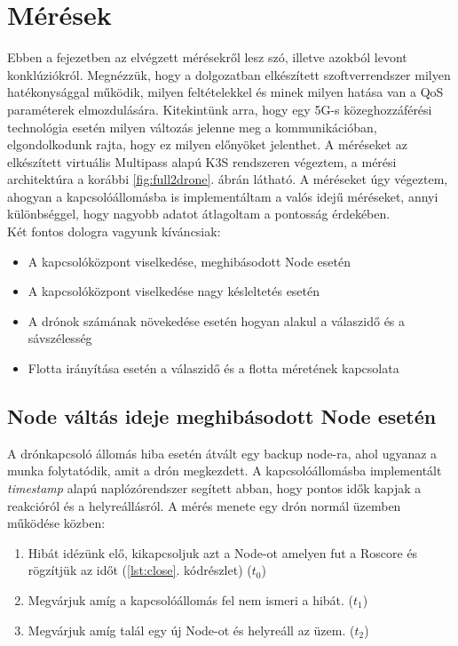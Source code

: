 \chapter{Mérések}

Ebben a fejezetben az elvégzett mérésekről lesz szó, illetve azokból levont konklúziókról. Megnézzük, hogy a dolgozatban elkészített szoftverrendszer milyen hatékonysággal működik, milyen feltételekkel és minek milyen hatása van a QoS paraméterek elmozdulására. Kitekintünk arra, hogy egy 5G-s közeghozzáférési technológia esetén milyen változás jelenne meg a kommunikációban, elgondolkodunk rajta, hogy ez milyen előnyöket jelenthet. A méréseket az elkészített virtuális Multipass alapú K3S rendszeren végeztem, a mérési architektúra a korábbi \ref{fig:full2drone}. ábrán látható. A méréseket úgy végeztem, ahogyan a kapcsolóállomásba is implementáltam a valós idejű méréseket, annyi különbséggel, hogy nagyobb adatot átlagoltam a pontosság érdekében. \\

\noindent
Két fontos dologra vagyunk kíváncsiak:
\begin{itemize}
	\item A kapcsolóközpont viselkedése, meghibásodott Node esetén
	\item A kapcsolóközpont viselkedése nagy késleltetés esetén
	\item A drónok számának növekedése esetén hogyan alakul a válaszidő és a sávszélesség
	\item Flotta irányítása esetén a válaszidő és a flotta méretének kapcsolata
\end{itemize}

\section{Node váltás ideje meghibásodott Node esetén}
A drónkapcsoló állomás hiba esetén átvált egy backup node-ra, ahol ugyanaz a munka folytatódik, amit a drón megkezdett. A kapcsolóállomásba implementált \emph{timestamp} alapú naplózórendszer segített abban, hogy pontos idők kapjak a reakcióról és a helyreállásról. A mérés menete egy drón normál üzemben működése közben:
\begin{enumerate}
	\item Hibát idézünk elő, kikapcsoljuk azt a Node-ot amelyen fut a Roscore és rögzítjük az időt (\ref{lst:close}. kódrészlet) ($t_0$)
	\item Megvárjuk amíg a kapcsolóállomás fel nem ismeri a hibát. ($t_1$)
	\item Megvárjuk amíg talál egy új Node-ot és helyreáll az üzem. ($t_2$)
\end{enumerate}

